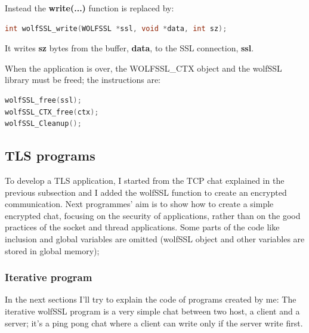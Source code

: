 \documentclass[a4paper,12pt]{article}
\begin{document}
Instead the \textbf{write(...)} function is replaced by:
\begin{lstlisting}[language=c]
int wolfSSL_write(WOLFSSL *ssl, void *data, int sz);
\end{lstlisting}
It writes \textbf{sz} bytes from the buffer, \textbf{data}, to the SSL connection, \textbf{ssl}.

When the application is over, the WOLFSSL\_CTX object and the wolfSSL library must be freed; the instructions are:
\begin{lstlisting}[language=c]
wolfSSL_free(ssl);
wolfSSL_CTX_free(ctx);
wolfSSL_Cleanup();
\end{lstlisting}


\subsection{TLS programs}
To develop a TLS application, I started from the TCP chat explained in the previous subsection and I added the wolfSSL function to create an encrypted communication.
Next programmes' aim is to show how to create a simple encrypted chat, focusing on the security of applications, rather than on the good practices of the socket and thread applications.
Some parts of the code like inclusion and global variables are omitted (wolfSSL object and other variables are stored in global memory); 
\subsubsection{Iterative program}
In the next sections I'll try to explain the code of programs created by me:
The iterative wolfSSL program is a very simple chat between two host, a client and a server; it's a ping pong chat where a client can write only if the server write first.
\end{document}
